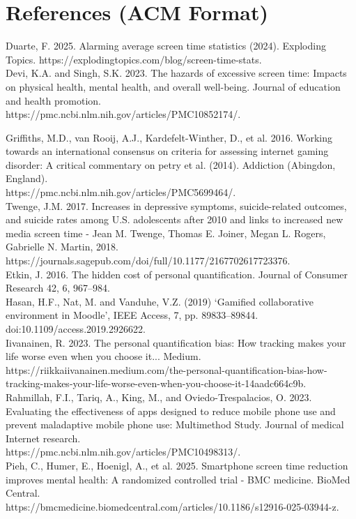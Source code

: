 \documentclass[sigconf, 11pt]{acmart}
\begin{document}
\section{References (ACM Format)}
Duarte, F. 2025. Alarming average screen time statistics (2024). Exploding Topics. https://explodingtopics.com/blog/screen-time-stats. 
\\

Devi, K.A. and Singh, S.K. 2023. The hazards of excessive screen time: Impacts on physical health, mental health, and overall well-being. Journal of education and health promotion. \\https://pmc.ncbi.nlm.nih.gov/articles/PMC10852174/. 

Griffiths, M.D., van Rooij, A.J., Kardefelt-Winther, D., et al. 2016. Working towards an international consensus on criteria for assessing internet gaming disorder: A critical commentary on petry et al. (2014). Addiction (Abingdon, England).
\\ https://pmc.ncbi.nlm.nih.gov/articles/PMC5699464/.
\\

Twenge, J.M. 2017. Increases in depressive symptoms, suicide-related outcomes, and suicide rates among U.S. adolescents after 2010 and links to increased new media screen time - Jean M. Twenge, Thomas E. Joiner, Megan L. Rogers, Gabrielle N. Martin, 2018. \\https://journals.sagepub.com/doi/full/10.1177/2167702617723376.\\


Etkin, J. 2016. The hidden cost of personal quantification. Journal of Consumer Research 42, 6, 967–984.
\\

Hasan, H.F., Nat, M. and Vanduhe, V.Z. (2019) ‘Gamified collaborative environment in Moodle’, IEEE Access, 7, pp. 89833–89844. doi:10.1109/access.2019.2926622.
\\

Iivanainen, R. 2023. The personal quantification bias: How tracking makes your life worse even when you choose it... Medium. https://riikkaiivanainen.medium.com/the-personal-quantification-bias-how-tracking-makes-your-life-worse-even-when-you-choose-it-14aadc664c9b.
\\

Rahmillah, F.I., Tariq, A., King, M., and  Oviedo-Trespalacios, O. 2023. Evaluating the effectiveness of apps designed to reduce mobile phone use and prevent maladaptive mobile phone use: Multimethod Study. Journal of medical Internet research.\\ 
https://pmc.ncbi.nlm.nih.gov/articles/PMC10498313/.
\\

Pieh, C., Humer, E., Hoenigl, A., et al. 2025. Smartphone screen time reduction improves mental health: A randomized controlled trial - BMC medicine. BioMed Central.\\ https://bmcmedicine.biomedcentral.com/articles/10.1186/s12916-025-03944-z.
\end{document}
